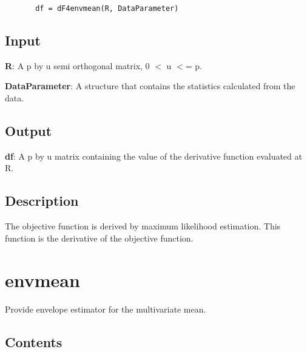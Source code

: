\documentclass[a4paper,11pt,openany]{memoir}
\begin{document}
\begin{verbatim}       df = dF4envmean(R, DataParameter)\end{verbatim}
    

\subsection*{Input}

\begin{par}
\textbf{R}: A p by u semi orthogonal matrix, 0 \ensuremath{<} u \ensuremath{<}= p.
\end{par} \vspace{1em}
\begin{par}
\textbf{DataParameter}: A structure that contains the statistics calculated from the data.
\end{par} \vspace{1em}


\subsection*{Output}

\begin{par}
\textbf{df}: A p by u matrix containing the value of the derivative function evaluated at R.
\end{par} \vspace{1em}


\subsection*{Description}

\begin{par}
The objective function is derived by maximum likelihood estimation. This function is the derivative of the objective function.
\end{par} \vspace{1em}

\newpage

\rmfamily
\color{black}\section{envmean}

\begin{par}
Provide envelope estimator for the multivariate mean.
\end{par} \vspace{1em}

\subsection*{Contents}
\end{document}
